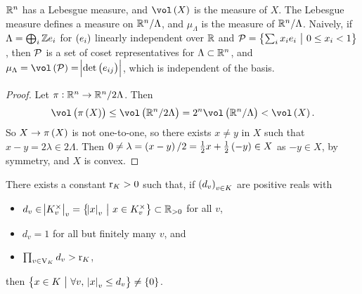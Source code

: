 \begin{remark*}
$ \mathbb{R}^n $ has a Lebesgue measure, and $ \vol\br{X} $ is the measure of $ X $. The Lebesgue measure defines a measure on $ \mathbb{R}^n / \Lambda $, and $ \mu_\Lambda $ is the measure of $ \mathbb{R}^n / \Lambda $. Naively, if $ \Lambda = \bigoplus_i \mathbb{Z} e_i $ for $ \br{e_i} $ linearly independent over $ \mathbb{R} $ and $ \PPP = \cbr{\sum_i x_ie_i \st 0 \le x_i < 1} $, then $ \mathcal{P} $ is a set of coset representatives for $ \Lambda \subset \mathbb{R}^n $, and $ \mu_\Lambda = \vol\br{\PPP} = \abs{\det \br{e_{ij}}} $, which is independent of the basis.
\end{remark*}

\begin{proof}
Let $ \pi : \mathbb{R}^n \to \mathbb{R}^n / 2\Lambda $. Then
$$ \vol\br{\pi\br{X}} \le \vol\br{\RR^n / 2\Lambda} = 2^n\vol\br{\RR^n / \Lambda} < \vol\br{X}. $$
So $ X \to \pi\br{X} $ is not one-to-one, so there exists $ x \ne y $ in $ X $ such that $ x - y = 2\lambda \in 2\Lambda $. Then $ 0 \ne \lambda = \br{x - y} / 2 = \tfrac{1}{2}x + \tfrac{1}{2}\br{-y} \in X $ as $ -y \in X $, by symmetry, and $ X $ is convex.
\end{proof}

\begin{theorem}
\label{thm:6.3}
There exists a constant $ \mathrm{r}_K > 0 $ such that, if $ \br{d_v}_{v \in K} $ are positive reals with
\begin{itemize}
\item $ d_v \in \abs{K_v^\times}_v = \cbr{\abs{x}_v \st x \in K_v^\times} \subset \RR_{> 0} $ for all $ v $,
\item $ d_v = 1 $ for all but finitely many $ v $, and
\item $ \prod_{v \in \mathrm{V}_K} d_v > \mathrm{r}_K $,
\end{itemize}
then $ \cbr{x \in K \st \forall v, \ \abs{x}_v \le d_v} \ne \cbr{0} $.
\end{theorem}

